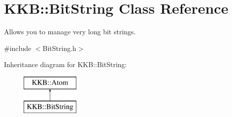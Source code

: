 \hypertarget{class_k_k_b_1_1_bit_string}{}\section{K\+KB\+:\+:Bit\+String Class Reference}
\label{class_k_k_b_1_1_bit_string}


Allows you to manage very long bit strings.  




{\ttfamily \#include $<$Bit\+String.\+h$>$}

Inheritance diagram for K\+KB\+:\+:Bit\+String\+:\begin{figure}[H]
\begin{center}
\leavevmode
\includegraphics[height=2.000000cm]{class_k_k_b_1_1_bit_string}
\end{center}
\end{figure}
